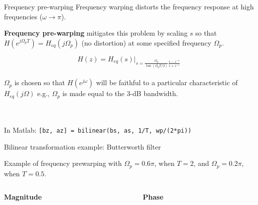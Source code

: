 \documentclass[10pt, handout]{beamer}
\begin{document}
%
\begin{frame}{Frequency pre-warping}
Frequency warping distorts the frequency response at high frequencies ($\omega\to\pi$).

\textbf{Frequency pre-warping} mitigates this problem by scaling $s$ so that $H(e^{j\Omega_p T}) = H_{eq}(j\Omega_p)$ (no distortion) at some specified frequency $\Omega_p$.

\begin{equation*}
H(z) = H_{eq}(s)|_{s = \frac{\Omega_p}{\tan(\Omega_pT/2)}\frac{1 - z^{-1}}{1 + z^{-1}}} \tag{bilinear transformation with frequency pre-warping}
\end{equation*}
~\\

$\Omega_p$ is chosen so that $H(e^{j\omega})$ will be faithful to a particular characteristic of $H_{eq}(j\Omega)$ e.g., $\Omega_p$ is made equal to the $3$-dB bandwidth.


~\\
~\\
In Matlab: \texttt{[bz, az] = bilinear(bs, as, 1/T, wp/(2*pi))}
\end{frame}

%
\begin{frame}{Bilinear transformation example: Butterworth filter}

Example of frequency prewarping with $\Omega_p = 0.6\pi$, when $T =2$, and $\Omega_p = 0.2\pi$, when $T =0.5$.

\vspace{0.5cm}
\begin{columns}
	\begin{column}{0.5\textwidth}
		\textbf{Magnitude}
		\begin{center}
			\resizebox{\linewidth}{!}{}
		\end{center}
	\end{column}
	\begin{column}{0.5\textwidth}
		\textbf{Phase}
		\begin{center}
			\resizebox{\linewidth}{!}{}
		\end{center}
	\end{column}
\end{columns}

\end{frame}
\end{document}
